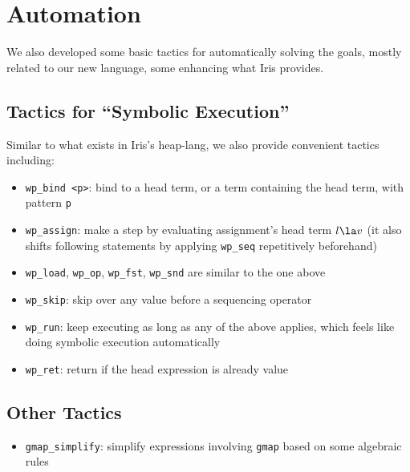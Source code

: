 \section{Automation}
\label{sec:auto}

We also developed some basic tactics for automatically solving the goals,
mostly related to our new language, some enhancing what Iris provides.

\subsection{Tactics for ``Symbolic Execution''}

Similar to what exists in Iris's heap-lang, we also provide convenient tactics
including:

\begin{itemize}
    \item \texttt{wp\_bind <p>}: bind to a head term, or a term containing the head term, with pattern \texttt{p}
    \item \texttt{wp\_assign}: make a step by evaluating assignment's head term $l \la v$
        (it also shifts following statements by applying \texttt{wp\_seq} repetitively beforehand)
    \item \texttt{wp\_load}, \texttt{wp\_op}, \texttt{wp\_fst}, \texttt{wp\_snd} are similar to the one above
    \item \texttt{wp\_skip}: skip over any value before a sequencing operator
    \item \texttt{wp\_run}: keep executing as long as any of the above applies, which feels like doing
      symbolic execution automatically
    \item \texttt{wp\_ret}: return if the head expression is already value
\end{itemize}

\subsection{Other Tactics}

\begin{itemize}
    \item \texttt{gmap\_simplify}: simplify expressions involving \texttt{gmap} based on some algebraic rules
\end{itemize}

